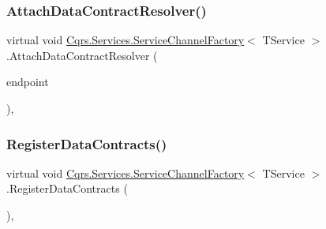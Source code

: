 \subsubsection{\texorpdfstring{Attach\+Data\+Contract\+Resolver()}{AttachDataContractResolver()}}
{\footnotesize\ttfamily virtual void \hyperlink{classCqrs_1_1Services_1_1ServiceChannelFactory}{Cqrs.\+Services.\+Service\+Channel\+Factory}$<$ T\+Service $>$.Attach\+Data\+Contract\+Resolver (\begin{DoxyParamCaption}\item[{Service\+Endpoint}]{endpoint }\end{DoxyParamCaption})\hspace{0.3cm}{\ttfamily [protected]}, {\ttfamily [virtual]}}

\mbox{\label{classCqrs_1_1Services_1_1ServiceChannelFactory_a0ef5c8298659383821b3b8901351db42}} 
\subsubsection{\texorpdfstring{Register\+Data\+Contracts()}{RegisterDataContracts()}}
{\footnotesize\ttfamily virtual void \hyperlink{classCqrs_1_1Services_1_1ServiceChannelFactory}{Cqrs.\+Services.\+Service\+Channel\+Factory}$<$ T\+Service $>$.Register\+Data\+Contracts (\begin{DoxyParamCaption}{ }\end{DoxyParamCaption})\hspace{0.3cm}{\ttfamily [protected]}, {\ttfamily [virtual]}}

